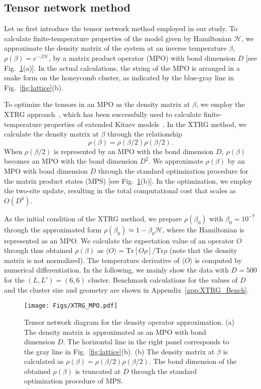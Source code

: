 \documentclass[twocolumn,superscriptaddress,showpacs, longbibliography, aps, prx]{revtex4-2}
\begin{document}
\subsection{Tensor network method}\label{subsec:Tensor network method}
Let us first introduce the tensor network method employed in our study. 
To calculate finite-temperature properties of the model given by Hamiltonian $\mathcal{H}$, we approximate the density matrix of the system at an inverse temperature $\beta$, $\rho(\beta) = e^{-\beta\mathcal{H}}$, by a matrix product operator (MPO) with bond dimension $D$ [see Fig.~\ref{fig:XTRG}(a)]. In the actual calculations, the string of the MPO is arranged in a snake form on the honeycomb cluster, as indicated by the blue-gray line in Fig.~\ref{fig:lattice}(b). 

To optimize the tensors in an MPO as the density matrix at $\beta$, 
we employ the XTRG approach~\cite{Chen2018}, which has been successfully used to calculate finite-temperature properties of extended Kitaev models~\cite{Li2020, LiZWWGQLGL2021}. 
In the XTRG method, we calculate the density matrix at $\beta$ through the relationship
\begin{equation}
  \rho(\beta)=\rho(\beta/2)\rho(\beta/2).
\end{equation}
When $\rho(\beta/2)$ is represented by an MPO with the bond dimension $D$, $\rho(\beta)$ becomes an MPO with the bond dimension $D^2$. 
We approximate $\rho(\beta)$ by an MPO with bond dimension $D$ through the standard optimization procedure for the matrix product states (MPS) \cite{Chen2018} [see Fig.~\ref{fig:XTRG}(b)]. 
In the optimization, we employ the two-site update, resulting in the total computational cost that scales as $O(D^4)$. 

As the initial condition of the XTRG method, we prepare $\rho(\beta_0)$ with $\beta_0 = 10^{-7}$ through the approximated form $\rho(\beta_0) \simeq 1 - \beta_0\mathcal{H}$, where the Hamiltonian is represented as an MPO. 
We calculate the expectation value of an operator ${O}$ through thus obtained $\rho(\beta)$ as $\langle {O} \rangle = \mathrm{Tr}[{O}\rho] /\mathrm{Tr}\rho$ (note that the density matrix is not normalized). 
The temperature derivative of $\langle {O} \rangle$ is computed by numerical differentiation.
In the following, we mainly show the data with $D=500$ for the $(L, L') = (6, 6)$ cluster. 
Benchmark calculations for the values of $D$ and the cluster size and geometry are shown in Appendix~\ref{app:XTRG_Bench}. 

\begin{figure}
  \begin{center}
    \texttt{[image: Figs/XTRG\_MPO.pdf]}
  \end{center}
  \caption{Tensor network diagram for the density operator approximation. (a) The density matrix is approximated as an MPO with bond dimension $D$. 
  The horizontal line in the right panel corresponds to the gray line in Fig.~\ref{fig:lattice}(b). 
  (b) The density matrix at $\beta$ is calculated as $\rho(\beta)=\rho(\beta/2)\rho(\beta/2)$. 
  The bond dimension of the obtained $\rho(\beta)$ is truncated at $D$ through the standard optimization procedure of MPS.}
  \label{fig:XTRG}
\end{figure}
\end{document}
